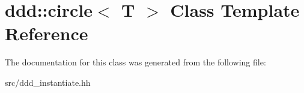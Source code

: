 \hypertarget{classddd_1_1circle}{}\section{ddd\+:\+:circle$<$ T $>$ Class Template Reference}
\label{classddd_1_1circle}


The documentation for this class was generated from the following file\+:\begin{DoxyCompactItemize}
\item 
src/ddd\+\_\+instantiate.\+hh\end{DoxyCompactItemize}
